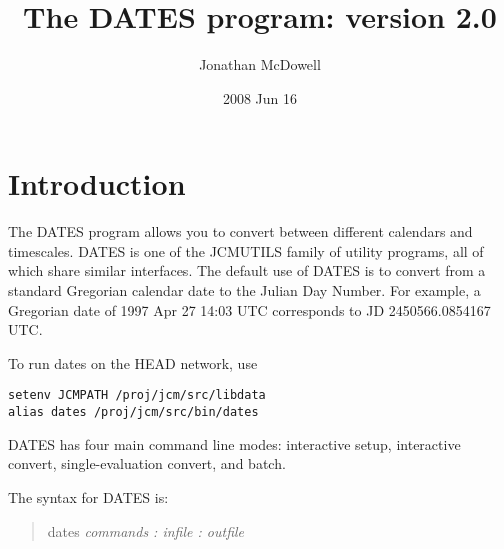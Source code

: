 \documentclass{article}
\begin{document}
\large


\title{The DATES program: version 2.0}

\author{Jonathan McDowell}

\date{2008 Jun 16}

\maketitle

\newpage

\normalsize


\tableofcontents
\section{Introduction}

The DATES program allows you to convert between different 
calendars and timescales. DATES is one of the JCMUTILS
family of utility programs, all of which share similar
interfaces. The default use of DATES is to convert from
a standard Gregorian calendar date to the Julian Day Number.
For example, a Gregorian date of 1997 Apr 27 14:03 UTC
corresponds to JD 2450566.0854167 UTC.

To run dates on the HEAD network, use
\begin{verbatim}
setenv JCMPATH /proj/jcm/src/libdata
alias dates /proj/jcm/src/bin/dates
\end{verbatim}

DATES has four main command line modes: interactive setup,
interactive convert,
single-evaluation convert, and batch.

The syntax for DATES is:
\begin{quote}
dates {\it commands : infile : outfile}
\end{quote}
\end{document}

